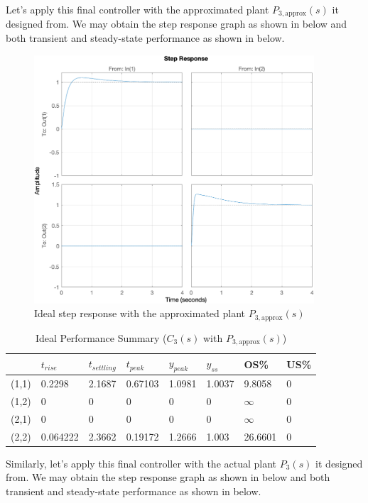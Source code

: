 \documentclass{tron}
\newcommand{\apx}{\text{approx}}
\begin{document}
Let's apply this final controller with the approximated plant $P_{3, \apx}(s)$ it designed from. We may obtain the step response graph as shown in  below and both transient and steady-state performance as shown in  below.

\begin{figure}[H]
	\centering
	\includegraphics[height=350px]{../matlab/output/p5/Ideal_step_response}
	\caption{Ideal step response with the approximated plant $P_{3, \apx}(s)$}
	\label{fig:p5:P3_aug:step-response}
\end{figure}

\begin{table}[h!]
  \begin{center}
    \caption{Ideal Performance Summary ($C_{3}(s)$ with $P_{3, \apx}(s)$)}
    \label{table:p5:perf:ideal}
		\begin{tabular}{llllllll}
		& $t_{rise}$ & $t_{settling}$ & $t_{peak}$ & $y_{peak}$ & $y_{ss}$ & OS\% & US\% \\ 
		\hline 
		(1,1) & 0.2298 & 2.1687 & 0.67103 & 1.0981 & 1.0037 & 9.8058 & 0 \\ 
		(1,2) & 0 & 0 & 0 & 0 & 0 & $\infty$ & 0 \\ 
		(2,1) & 0 & 0 & 0 & 0 & 0 & $\infty$ & 0 \\ 
		(2,2) & 0.064222 & 2.3662 & 0.19172 & 1.2666 & 1.003 & 26.6601 & 0 \\ 
		\hline 
		\end{tabular}
  \end{center}
\end{table}

Similarly, let's apply this final controller with the actual plant $P_{3}(s)$ it designed from. We may obtain the step response graph as shown in  below and both transient and steady-state performance as shown in  below.
\end{document}
